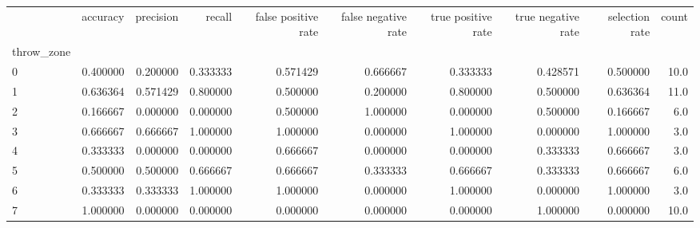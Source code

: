 \begin{tabular}{lrrrrrrrrr}
\toprule
{} &  accuracy &  precision &    recall &  false positive rate &  false negative rate &  true positive rate &  true negative rate &  selection rate &  count \\
throw\_zone &           &            &           &                      &                      &                     &                     &                 &        \\
\midrule
0          &  0.400000 &   0.200000 &  0.333333 &             0.571429 &             0.666667 &            0.333333 &            0.428571 &        0.500000 &   10.0 \\
1          &  0.636364 &   0.571429 &  0.800000 &             0.500000 &             0.200000 &            0.800000 &            0.500000 &        0.636364 &   11.0 \\
2          &  0.166667 &   0.000000 &  0.000000 &             0.500000 &             1.000000 &            0.000000 &            0.500000 &        0.166667 &    6.0 \\
3          &  0.666667 &   0.666667 &  1.000000 &             1.000000 &             0.000000 &            1.000000 &            0.000000 &        1.000000 &    3.0 \\
4          &  0.333333 &   0.000000 &  0.000000 &             0.666667 &             0.000000 &            0.000000 &            0.333333 &        0.666667 &    3.0 \\
5          &  0.500000 &   0.500000 &  0.666667 &             0.666667 &             0.333333 &            0.666667 &            0.333333 &        0.666667 &    6.0 \\
6          &  0.333333 &   0.333333 &  1.000000 &             1.000000 &             0.000000 &            1.000000 &            0.000000 &        1.000000 &    3.0 \\
7          &  1.000000 &   0.000000 &  0.000000 &             0.000000 &             0.000000 &            0.000000 &            1.000000 &        0.000000 &   10.0 \\
\bottomrule
\end{tabular}
